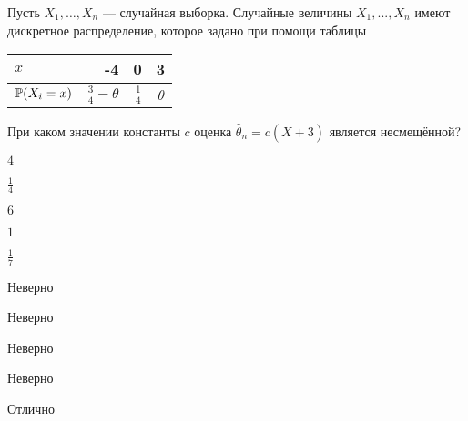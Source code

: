 
\begin{question}
Пусть \(X_1, \ldots , X_n\) — случайная выборка. Случайные величины
\(X_1, ... , X_n\) имеют дискретное распределение, которое задано при
помощи таблицы

\begin{center}
\begin{tabular}{lrrr} \toprule
$x$  & -4 & 0 & 3 \\
\midrule
$\P(X_i=x)$ & $\frac{3}{4} - \theta$ & $\frac{1}{4}$ & $\theta$\\
\bottomrule
\end{tabular}
\end{center}

При каком значении константы \(c\) оценка
\(\hat{\theta}_n = c (\bar{X} + 3)\) является несмещённой?
\begin{answerlist}
  \item \(4\)
  \item \(\frac{1}{4}\)
  \item \(6\)
  \item \(1\)
  \item \(\frac{1}{7}\)
\end{answerlist}
\end{question}

\begin{solution}
\begin{answerlist}
  \item Неверно
  \item Неверно
  \item Неверно
  \item Неверно
  \item Отлично
\end{answerlist}
\end{solution}

